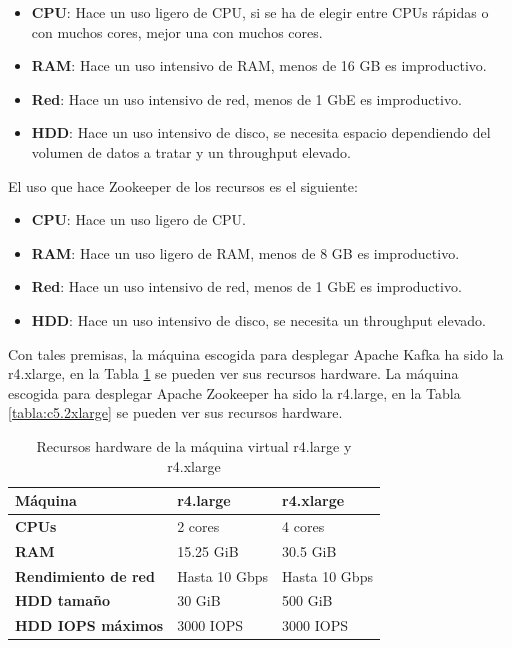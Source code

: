 \begin{itemize} 
	\item \textbf{CPU}: Hace un uso ligero de CPU, si se ha de elegir entre CPUs rápidas o con muchos cores, mejor una con muchos cores.
	\item \textbf{RAM}: Hace un uso intensivo de RAM, menos de 16 GB es improductivo.
	\item \textbf{Red}: Hace un uso intensivo de red, menos de 1 GbE es improductivo.
	\item \textbf{HDD}: Hace un uso intensivo de disco, se necesita espacio dependiendo del volumen de datos a tratar y un throughput elevado.
\end{itemize}

El uso que hace Zookeeper de los recursos es el siguiente\cite{Tfg:zookeeperdeploy}:

\begin{itemize} 
	\item \textbf{CPU}: Hace un uso ligero de CPU.
	\item \textbf{RAM}: Hace un uso ligero de RAM, menos de 8 GB es improductivo.
	\item \textbf{Red}: Hace un uso intensivo de red, menos de 1 GbE es improductivo.
	\item \textbf{HDD}: Hace un uso intensivo de disco, se necesita un throughput elevado.
\end{itemize}

Con tales premisas, la máquina escogida para desplegar Apache Kafka ha sido la r4.xlarge, en la Tabla \ref{tabla:kafkazookeeper} se pueden ver sus recursos hardware. La máquina escogida para desplegar Apache Zookeeper ha sido la r4.large, en la Tabla \ref{tabla:c5.2xlarge} se pueden ver sus recursos hardware.

\begin{table}[H]\label{tabla:kafkazookeeper}
	\centering
	\begin{tabular}{|l|l|l|}
		\hline
		\textbf{Máquina}            & \textbf{r4.large} & \textbf{r4.xlarge} \\ \hline
		\textbf{CPUs}               & 2 cores           & 4 cores            \\ \hline
		\textbf{RAM}                & 15.25 GiB         & 30.5 GiB           \\ \hline
		\textbf{Rendimiento de red} & Hasta 10 Gbps     & Hasta 10 Gbps      \\ \hline
		\textbf{HDD tamaño}         & 30 GiB            & 500 GiB            \\ \hline
		\textbf{HDD IOPS máximos}   & 3000 IOPS         & 3000 IOPS          \\ \hline
	\end{tabular}
	\caption{Recursos hardware de la máquina virtual r4.large y r4.xlarge}
\end{table}

